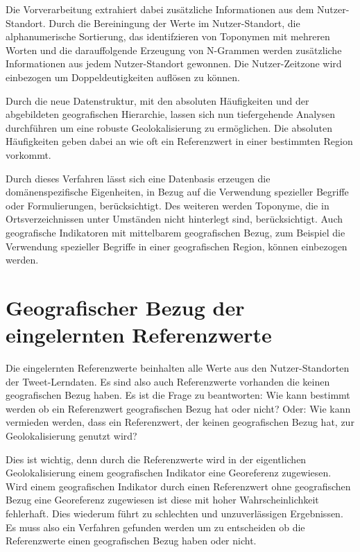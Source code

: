 			Die Vorverarbeitung extrahiert dabei zusätzliche Informationen aus dem Nutzer-Standort.
			Durch die Bereiningung der Werte im Nutzer-Standort, die alphanumerische Sortierung, das identifzieren von Toponymen mit mehreren Worten und die darauffolgende Erzeugung von N-Grammen werden zusätzliche Informationen aus jedem Nutzer-Standort gewonnen.
			Die Nutzer-Zeitzone wird einbezogen um Doppeldeutigkeiten auflösen zu können.

			Durch die neue Datenstruktur, mit den absoluten Häufigkeiten und der abgebildeten geografischen Hierarchie, lassen sich nun tiefergehende Analysen durchführen um eine robuste Geolokalisierung zu ermöglichen. 
			Die absoluten Häufigkeiten geben dabei an wie oft ein Referenzwert in einer bestimmten Region vorkommt.

			Durch dieses Verfahren lässt sich eine Datenbasis erzeugen die domänenspezifische Eigenheiten, in Bezug auf die Verwendung spezieller Begriffe oder Formulierungen, berücksichtigt.
			Des weiteren werden Toponyme, die in Ortsverzeichnissen unter Umständen nicht hinterlegt sind, berücksichtigt.
			Auch geografische Indikatoren mit mittelbarem geografischen Bezug, zum Beispiel die Verwendung spezieller Begriffe in einer geografischen Region, können einbezogen werden. 

	\section{Geografischer Bezug der eingelernten Referenzwerte} \label{sec:geografischerBezug} 
			
		Die eingelernten Referenzwerte beinhalten alle Werte aus den Nutzer-Standorten der Tweet-Lerndaten.
		Es sind also auch Referenzwerte vorhanden die keinen geografischen Bezug haben.
		Es ist die Frage zu beantworten: Wie kann bestimmt werden ob ein Referenzwert geografischen Bezug hat oder nicht?
		Oder: Wie kann vermieden werden, dass ein Referenzwert, der keinen geografischen Bezug hat, zur Geolokalisierung genutzt wird?
		
		Dies ist wichtig, denn durch die Referenzwerte wird in der eigentlichen Geolokalisierung einem geografischen Indikator eine Georeferenz zugewiesen. 
		Wird einem geografischen Indikator durch einen Referenzwert ohne geografischen Bezug eine Georeferenz zugewiesen ist diese mit hoher Wahrscheinlichkeit fehlerhaft.
		Dies wiederum führt zu schlechten und unzuverlässigen Ergebnissen.
		Es muss also ein Verfahren gefunden werden um zu entscheiden ob die Referenzwerte einen geografischen Bezug haben oder nicht.

